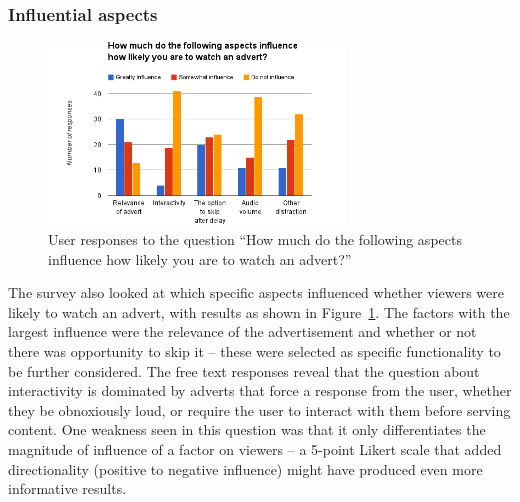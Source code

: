 \subsubsection{Influential aspects}
\label{sec:prestudy_influence}
\begin{figure}[H]
	\centering
	\vspace{-10pt}
	\includegraphics[width=0.7\textwidth, clip=true, trim=0 0 0 60pt]{images/prestudy_influence.png}
	\caption{User responses to the question ``How much do the following aspects influence how likely you are to watch an advert?''}
	\label{fig:prestudy_influence}
	\vspace{-25pt}
\end{figure}
The survey also looked at which specific aspects influenced whether viewers were likely to watch an advert, with results as shown in Figure~\ref{fig:prestudy_influence}. The factors with the largest influence were the relevance of the advertisement and whether or not there was opportunity to skip it -- these were selected as specific functionality to be further considered. 
The free text responses reveal that the question about interactivity is dominated by adverts that force a response from the user, whether they be obnoxiously loud, or require the user to interact with them before serving content. 
One weakness seen in this question was that it only differentiates the magnitude of influence of a factor on viewers -- a 5-point Likert scale that added directionality (positive to negative influence) might have produced even more informative results.



